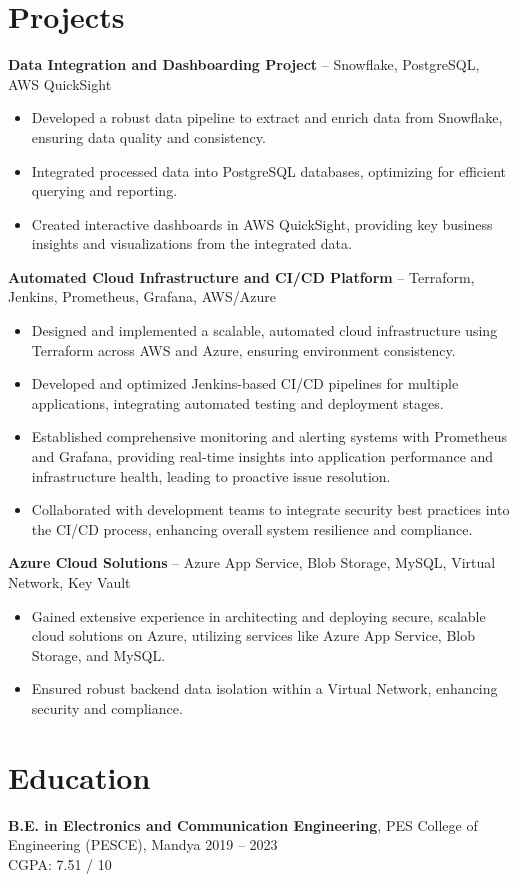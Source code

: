\documentclass[a4paper,10pt]{article}
\begin{document}
\section*{Projects}
	\textbf{Data Integration and Dashboarding Project} – Snowflake, PostgreSQL, AWS QuickSight
\begin{itemize}[leftmargin=0.25in, label=\textbullet]
    \item Developed a robust data pipeline to extract and enrich data from Snowflake, ensuring data quality and consistency.
    \item Integrated processed data into PostgreSQL databases, optimizing for efficient querying and reporting.
    \item Created interactive dashboards in AWS QuickSight, providing key business insights and visualizations from the integrated data.
\end{itemize}


	\textbf{Automated Cloud Infrastructure and CI/CD Platform} – Terraform, Jenkins, Prometheus, Grafana, AWS/Azure
\begin{itemize}[leftmargin=0.25in, label=\textbullet]
    \item Designed and implemented a scalable, automated cloud infrastructure using Terraform across AWS and Azure, ensuring environment consistency.
    \item Developed and optimized Jenkins-based CI/CD pipelines for multiple applications, integrating automated testing and deployment stages.
    \item Established comprehensive monitoring and alerting systems with Prometheus and Grafana, providing real-time insights into application performance and infrastructure health, leading to proactive issue resolution.
    \item Collaborated with development teams to integrate security best practices into the CI/CD process, enhancing overall system resilience and compliance.
\end{itemize}


\textbf{Azure Cloud Solutions} – Azure App Service, Blob Storage, MySQL, Virtual Network, Key Vault
\begin{itemize}[leftmargin=0.25in, label=\textbullet]
    \item Gained extensive experience in architecting and deploying secure, scalable cloud solutions on Azure, utilizing services like Azure App Service, Blob Storage, and MySQL.

    \item Ensured robust backend data isolation within a Virtual Network, enhancing security and compliance.
\end{itemize}

\section*{Education}
\textbf{B.E. in Electronics and Communication Engineering}, PES College of Engineering (PESCE), Mandya \hfill 2019 – 2023 \\CGPA: 7.51 / 10
\end{document}
